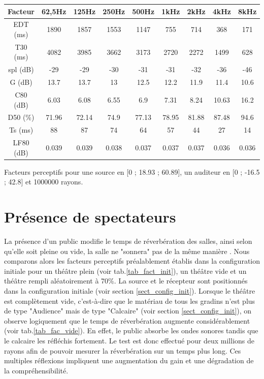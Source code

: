 \begin{tableth} 
 \begin{tabular}{| *{9}{c|}} 
 \hline 
 Facteur & 62,5Hz & 125Hz & 250Hz & 500Hz & 1kHz & 2kHz & 4kHz & 8kHz \\ 
 \hline 
 \hline 
\gls{EDT} (ms)& 1890& 1857& 1553& 1147& 755& 714& 368& 171 \\ 
 \hline 
\gls{T30} (ms)& 4082& 3985& 3662& 3173& 2720& 2272& 1499& 628 \\ 
 \hline 
\gls{spl} (dB)& -29& -29& -30& -31& -31& -32& -36& -46 \\ 
 \hline 
\gls{G} (dB)& 13.7& 13.7& 13& 12.5& 12.2& 11.9& 11.4& 10.6 \\ 
 \hline 
\gls{C80} (dB)& 6.03& 6.08& 6.55& 6.9& 7.31& 8.24& 10.63& 16.2 \\ 
 \hline 
\gls{D50} (\%)& 71.96& 72.14& 74.9& 77.13& 78.95& 81.88& 87.48& 94.6 \\ 
 \hline 
\gls{Ts} (ms)& 88& 87& 74& 64& 57& 44& 27& 14 \\ 
 \hline 
\gls{LF80} (dB)& 0.039& 0.039& 0.038& 0.037& 0.037& 0.037& 0.036& 0.036 \\ 
 \hline 
\end{tabular} 
 \caption{Facteurs perceptifs pour une source en [0 ; 18.93 ; 60.89], un auditeur en [0 ; -16.5 ; 42.8] et 1000000 rayons.} 
 \label{tab_niche} 
 \end{tableth}




\section{Présence de spectateurs}
La présence d'un public modifie le temps de réverbération des salles, ainsi selon qu'elle soit pleine ou vide, la salle ne "sonnera" pas de la même manière \cite[p.212]{jouhaneau}. Nous comparons alors les facteurs perceptifs préalablement établis dans la configuration initiale pour un théâtre plein (voir tab.\ref{tab_fact_init}), un théâtre vide et un théâtre rempli aléatoirement à 70\%. La source et le récepteur sont positionnés dans la configuration initiale (voir section \ref{sect_config_init}). Lorsque le théâtre est complètement vide, c'est-à-dire que le matériau de tous les gradins n'est plus de type "Audience" mais de type "Calcaire" (voir section \ref{sect_config_init}), on observe logiquement que le temps de réverbération augmente considérablement (voir tab.\ref{tab_fac_vide}). En effet, le public absorbe les ondes sonores tandis que le calcaire les réfléchis fortement. Le test est donc effectué pour deux millions de rayons afin de pouvoir mesurer la réverbération sur un temps plus long. Ces multiples réflexions impliquent une augmentation du gain et une dégradation de la compréhensibilité.

